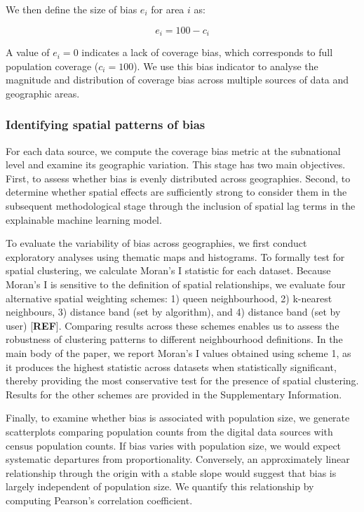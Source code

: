 \documentclass[]{rsos}%
\begin{document}
We then define the size of bias \(e_i\) for area \(i\) as:

\begin{equation} \label{eq:size-bias}
e_i = 100 - c_i
\end{equation}

A value of \(e_i = 0\) indicates a lack of coverage bias, which
corresponds to full population coverage (\(c_i = 100\)). We use this bias
indicator to analyse the magnitude and distribution of coverage bias
across multiple sources of data and geographic areas.

\subsubsection{Identifying spatial patterns of bias}\label{identifying-spatial-patterns-of-bias}

For each data source, we compute the coverage bias metric at the
subnational level and examine its geographic variation. This stage has
two main objectives. First, to assess whether bias is evenly distributed
across geographies. Second, to determine whether spatial effects are
sufficiently strong to consider them in the subsequent methodological
stage through the inclusion of spatial lag terms in the explainable
machine learning model.

To evaluate the variability of bias across geographies, we first conduct
exploratory analyses using thematic maps and histograms. To formally
test for spatial clustering, we calculate Moran's I statistic for each
dataset. Because Moran's I is sensitive to the definition of spatial
relationships, we evaluate four alternative spatial weighting schemes:
1) queen neighbourhood, 2) k-nearest neighbours, 3) distance band (set
by algorithm), and 4) distance band (set by user) {[}\textbf{REF}{]}. Comparing
results across these schemes enables us to assess the robustness of
clustering patterns to different neighbourhood definitions. In the main
body of the paper, we report Moran's I values obtained using scheme 1,
as it produces the highest statistic across datasets when statistically
significant, thereby providing the most conservative test for the
presence of spatial clustering. Results for the other schemes are
provided in the Supplementary Information.

Finally, to examine whether bias is associated with population size, we
generate scatterplots comparing population counts from the digital data
sources with census population counts. If bias varies with population
size, we would expect systematic departures from proportionality.
Conversely, an approximately linear relationship through the origin with
a stable slope would suggest that bias is largely independent of
population size. We quantify this relationship by computing Pearson's
correlation coefficient.
\end{document}
